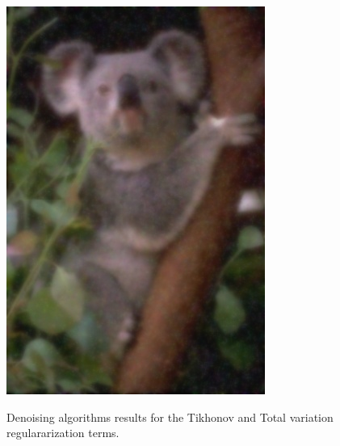 \begin{figure}
{\includegraphics[scale=0.38]{figures/chapter2/denoising/coala-tikhonov.png}
}%
%
\caption{Denoising algorithms results for the Tikhonov and Total variation regulararization terms.}
\label{ch1:fig:denoising-results}
\end{figure}

